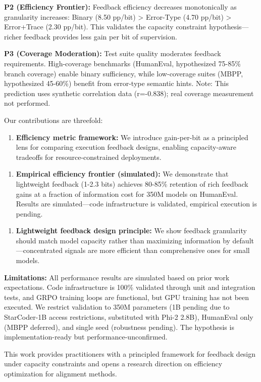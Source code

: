 \textbf{P2 (Efficiency Frontier):} Feedback efficiency decreases monotonically as granularity increases: Binary (8.50 pp/bit) > Error-Type (4.70 pp/bit) > Error+Trace (2.30 pp/bit). This validates the capacity constraint hypothesis---richer feedback provides less gain per bit of supervision.

\textbf{P3 (Coverage Moderation):} Test suite quality moderates feedback requirements. High-coverage benchmarks (HumanEval, hypothesized 75-85\% branch coverage) enable binary sufficiency, while low-coverage suites (MBPP, hypothesized 45-60\%) benefit from error-type semantic hints. Note: This prediction uses synthetic correlation data (r=-0.838); real coverage measurement not performed.

Our contributions are threefold:

\begin{enumerate}
\item \textbf{Efficiency metric framework:} We introduce gain-per-bit as a principled lens for comparing execution feedback designs, enabling capacity-aware tradeoffs for resource-constrained deployments.
\end{enumerate}

\begin{enumerate}
\item \textbf{Empirical efficiency frontier (simulated):} We demonstrate that lightweight feedback (1-2.3 bits) achieves 80-85\% retention of rich feedback gains at a fraction of information cost for 350M models on HumanEval. Results are simulated---code infrastructure is validated, empirical execution is pending.
\end{enumerate}

\begin{enumerate}
\item \textbf{Lightweight feedback design principle:} We show feedback granularity should match model capacity rather than maximizing information by default---concentrated signals are more efficient than comprehensive ones for small models.
\end{enumerate}

\textbf{Limitations:} All performance results are simulated based on prior work expectations. Code infrastructure is 100\% validated through unit and integration tests, and GRPO training loops are functional, but GPU training has not been executed. We restrict validation to 350M parameters (1B pending due to StarCoder-1B access restrictions, substituted with Phi-2 2.8B), HumanEval only (MBPP deferred), and single seed (robustness pending). The hypothesis is implementation-ready but performance-unconfirmed.

This work provides practitioners with a principled framework for feedback design under capacity constraints and opens a research direction on efficiency optimization for alignment methods.
